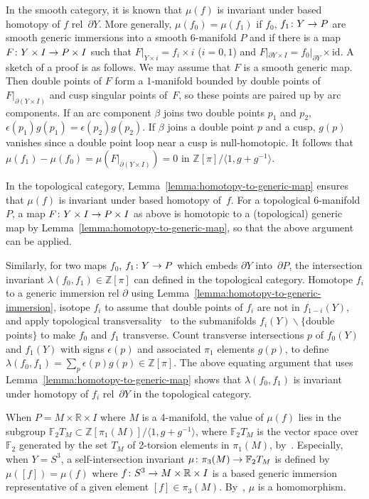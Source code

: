 \documentclass[11pt]{amsart}
\def\to{\mathchoice{\longrightarrow}{\rightarrow}{\rightarrow}{\rightarrow}}
\theoremstyle{definition}
\theoremstyle{theorem-giventitle}
\theoremstyle{definition-giventitle}
\numberwithin{equation}{section}
\def\Z{\mathbb{Z}}
\def\R{\mathbb{R}}
\def\bF{{\mathbb{F}}}
\def\id{\mathrm{id}}
\def\setminus{\smallsetminus}
\begin{document}
In the smooth category, it is known that $\mu(f)$ is invariant under based homotopy of $f$ rel~$\partial Y$.
More generally, $\mu(f_0)=\mu(f_1)$ if $f_0$, $f_1\colon Y\to P$ are smooth generic immersions into a smooth 6-manifold $P$ and if there is a map $F\colon Y\times I\to P\times I$ such that $F|_{Y\times i} = f_i\times i$ ($i=0,1$) and $F|_{\partial Y\times I} = f_0|_{\partial Y}\times\id$.
A sketch of a proof is as follows.
We may assume that $F$ is a smooth generic map.
Then double points of $F$ form a 1-manifold bounded by double points of $F|_{\partial(Y\times I)}$ and cusp singular points of~$F$, so these points are paired up by arc components.
If an arc component $\beta$ joins two double points $p_1$ and $p_2$, $\epsilon(p_1)g(p_1) = \epsilon(p_2)g(p_2)$.
If $\beta$ joins a double point $p$ and a cusp, $g(p)$ vanishes since a double point loop near a cusp is null-homotopic.
It follows that $\mu(f_1)-\mu(f_0)=\mu(F|_{\partial(Y\times I)})=0$ in $\Z[\pi]/\langle 1,g+g^{-1}\rangle$.

In the topological category, Lemma~\ref{lemma:homotopy-to-generic-map} ensures that $\mu(f)$ is invariant under based homotopy of~$f$.
For a topological 6-manifold $P$, a map $F\colon Y\times I \to P\times I$ as above is homotopic to a (topological) generic map by Lemma~\ref{lemma:homotopy-to-generic-map}, so that the above argument can be applied.

Similarly, for two maps $f_0$, $f_1\colon Y\to P$ which embeds $\partial Y$ into~$\partial P$, the intersection invariant $\lambda(f_0,f_1)\in \Z[\pi]$ can defined in the topological category.
Homotope $f_i$ to a generic immersion rel $\partial$ using Lemma~\ref{lemma:homotopy-to-generic-immersion}, isotope $f_i$ to assume that double points of $f_i$ are not in $f_{1-i}(Y)$, and apply topological transversality~\cite[9.5]{Freedman-Quinn:1990-1} to the submanifolds $f_i(Y)\setminus\{$double points$\}$ to make $f_0$ and $f_1$ transverse.
Count transverse intersections $p$ of $f_0(Y)$ and $f_1(Y)$ with signs $\epsilon(p)$ and associated $\pi_1$ elements $g(p)$, to define $\lambda(f_0,f_1)=\sum_p \epsilon(p)g(p) \in \Z[\pi]$.
The above equating argument that uses Lemma~\ref{lemma:homotopy-to-generic-map} shows that $\lambda(f_0,f_1)$ is invariant under homotopy of $f_i$ rel~$\partial Y$ in the topological category.

When $P=M\times \R\times I$ where $M$ is a 4-manifold, the value of $\mu(f)$ lies in the subgroup $\bF_2 T_M \subset \Z[\pi_1(M)] / \langle 1,g+g^{-1}\rangle$, where $\bF_2 T_M$ is the vector space over $\bF_2$ generated by the set $T_M$ of 2-torsion elements in $\pi_1(M)$, by~\cite[Lemma~4.1]{Schneiderman-Teichner:2022-1}.
Especially, when $Y=S^3$, a self-intersection invariant $\mu\colon \pi_3(M)\to \bF_2 T_M$ is defined by $\mu([f])=\mu(f)$ where $f\colon S^3\to M\times\R\times I$ is a based generic immersion representative of a given element $[f]\in \pi_3(M)$.
By~\cite[Lemma~4.1]{Schneiderman-Teichner:2022-1}, $\mu$ is a homomorphism.
\end{document}
